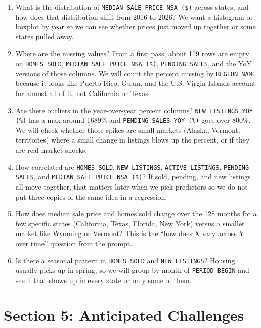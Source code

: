 \documentclass[12pt]{article}
\begin{document}
\begin{enumerate}
\item What is the distribution of \texttt{MEDIAN SALE PRICE NSA (\$)} across states, and how does that distribution shift from 2016 to 2026? We want a histogram or boxplot by year so we can see whether prices just moved up together or some states pulled away.

\item Where are the missing values? From a first pass, about 119 rows are empty on \texttt{HOMES SOLD}, \texttt{MEDIAN SALE PRICE NSA (\$)}, \texttt{PENDING SALES}, and the YoY versions of those columns. We will count the percent missing by \texttt{REGION NAME} because it looks like Puerto Rico, Guam, and the U.S. Virgin Islands account for almost all of it, not California or Texas.

\item Are there outliers in the year-over-year percent columns? \texttt{NEW LISTINGS YOY (\%)} has a max around 1689\% and \texttt{PENDING SALES YOY (\%)} goes over 800\%. We will check whether those spikes are small markets (Alaska, Vermont, territories) where a small change in listings blows up the percent, or if they are real market shocks.

\item How correlated are \texttt{HOMES SOLD}, \texttt{NEW LISTINGS}, \texttt{ACTIVE LISTINGS}, \texttt{PENDING SALES}, and \texttt{MEDIAN SALE PRICE NSA (\$)}? If sold, pending, and new listings all move together, that matters later when we pick predictors so we do not put three copies of the same idea in a regression.

\item How does median sale price and homes sold change over the 128 months for a few specific states (California, Texas, Florida, New York) versus a smaller market like Wyoming or Vermont? This is the ``how does X vary across Y over time'' question from the prompt.

\item Is there a seasonal pattern in \texttt{HOMES SOLD} and \texttt{NEW LISTINGS}? Housing usually picks up in spring, so we will group by month of \texttt{PERIOD BEGIN} and see if that shows up in every state or only some of them.
\end{enumerate}

\section{Section 5: Anticipated Challenges}
\end{document}
